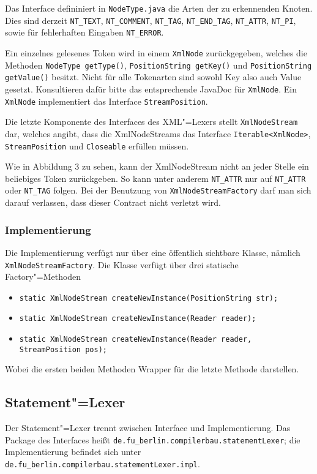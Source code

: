 \documentclass[10pt,a4paper,ngerman,titlepage,tocindentauto]{scrartcl}
\newcommand{\n}{\linebreak[1]}
\begin{document}
				Das Interface defininiert in \texttt{NodeType.java} die Arten der zu erkennenden Knoten.
				Dies sind derzeit \texttt{NT\_TEXT}, \texttt{NT\_COMMENT}, \texttt{NT\_TAG}, \texttt{NT\_END\_TAG},
				\texttt{NT\_ATTR}, \texttt{NT\_PI}, sowie für fehlerhaften Eingaben \texttt{NT\_ERROR}.
				
				Ein einzelnes gelesenes Token wird in einem \texttt{XmlNode} zurückgegeben, welches die Methoden
				\texttt{NodeType getType()}, \texttt{PositionString getKey()} und \texttt{PositionString getValue()}
				besitzt. Nicht für alle Tokenarten sind sowohl Key also auch Value gesetzt. Konsultieren dafür
				bitte das entsprechende JavaDoc für \texttt{XmlNode}. Ein \texttt{XmlNode} implementiert das Interface
				\texttt{StreamPosition}.
				
				Die letzte Komponente des Interfaces des XML"=Lexers stellt \texttt{XmlNodeStream} dar, welches
				angibt, dass die XmlNodeStreams das Interface \texttt{Iterable<{\n}XmlNode>}, \texttt{StreamPosition} und
				\texttt{Closeable} erfüllen müssen.
				
				Wie in Abbildung 3 zu sehen, kann der XmlNodeStream nicht an jeder Stelle ein beliebiges Token zurückgeben.
				So kann unter anderem \texttt{NT\_ATTR} nur auf \texttt{NT\_ATTR} oder \texttt{NT\_TAG} folgen.
				Bei der Benutzung von \texttt{XmlNodeStreamFactory} darf man sich darauf verlassen, dass dieser Contract
				nicht verletzt wird.
			
			\subsubsection*{Implementierung}
				Die Implementierung verfügt nur über eine öffentlich sichtbare Klasse, nämlich \texttt{XmlNodeStreamFactory}.
				Die Klasse verfügt über drei statische Factory"=Methoden
				\begin{itemize}
					\item \texttt{static XmlNodeStream createNewInstance(PositionString str);}
					\item \texttt{static XmlNodeStream createNewInstance(Reader reader);}
					\item \texttt{static XmlNodeStream createNewInstance(Reader reader, StreamPosition pos);}
				\end{itemize}
				Wobei die ersten beiden Methoden Wrapper für die letzte Methode darstellen.
	
		\subsection{Statement"=Lexer}
			Der Statement"=Lexer trennt zwischen Interface und Implementierung.
			Das Package des Interfaces heißt \texttt{de.{\n}fu\_berlin.{\n}compilerbau.{\n}statementLexer};
			die Implementierung befindet sich unter \texttt{de.{\n}fu\_berlin.{\n}compilerbau.{\n}statementLexer.{\n}impl}.
			
\end{document}
